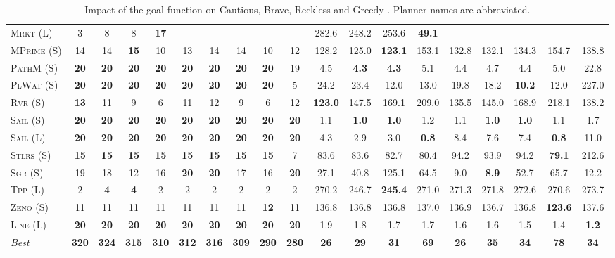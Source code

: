\begin{table}[tb]
{\begin{tabular}{|l||ccccccccc||ccccccccc||}
\textsc{Mrkt} (L)&3&8&8&\textbf{17}&-&-&-&-&-&282.6&248.2&253.6&\textbf{49.1}&-&-&-&-&-\\
\textsc{MPrime} (S)&14&14&\textbf{15}&10&13&14&14&10&12&128.2&125.0&\textbf{123.1}&153.1&132.8&132.1&134.3&154.7&138.8\\
\textsc{PathM} (S)&\textbf{20}&\textbf{20}&\textbf{20}&\textbf{20}&\textbf{20}&\textbf{20}&\textbf{20}&\textbf{20}&19&4.5&\textbf{4.3}&\textbf{4.3}&5.1&4.4&4.7&4.4&5.0&22.8\\
\textsc{PlWat} (S)&\textbf{20}&\textbf{20}&\textbf{20}&\textbf{20}&\textbf{20}&\textbf{20}&\textbf{20}&\textbf{20}&5&24.2&23.4&12.0&13.0&19.8&18.2&\textbf{10.2}&12.0&227.0\\
\textsc{Rvr} (S)&\textbf{13}&11&9&6&11&12&9&6&12&\textbf{123.0}&147.5&169.1&209.0&135.5&145.0&168.9&218.1&138.2\\
\textsc{Sail} (S)&\textbf{20}&\textbf{20}&\textbf{20}&\textbf{20}&\textbf{20}&\textbf{20}&\textbf{20}&\textbf{20}&\textbf{20}&1.1&\textbf{1.0}&\textbf{1.0}&1.2&1.1&\textbf{1.0}&\textbf{1.0}&1.1&1.7\\
\textsc{Sail} (L)&\textbf{20}&\textbf{20}&\textbf{20}&\textbf{20}&\textbf{20}&\textbf{20}&\textbf{20}&\textbf{20}&\textbf{20}&4.3&2.9&3.0&\textbf{0.8}&8.4&7.6&7.4&\textbf{0.8}&11.0\\
\textsc{Stlrs} (S)&\textbf{15}&\textbf{15}&\textbf{15}&\textbf{15}&\textbf{15}&\textbf{15}&\textbf{15}&\textbf{15}&7&83.6&83.6&82.7&80.4&94.2&93.9&94.2&\textbf{79.1}&212.6\\
\textsc{Sgr} (S)&19&18&12&16&\textbf{20}&\textbf{20}&17&16&\textbf{20}&27.1&40.8&125.1&64.5&9.0&\textbf{8.9}&52.7&65.7&12.2\\
\textsc{Tpp} (L)&2&\textbf{4}&\textbf{4}&2&2&2&2&2&2&270.2&246.7&\textbf{245.4}&271.0&271.3&271.8&272.6&270.6&273.7\\
\textsc{Zeno} (S)&11&11&11&11&11&11&11&\textbf{12}&11&136.8&136.8&136.8&137.0&136.9&136.7&136.8&\textbf{123.6}&137.6\\
\textsc{Line} (L)&\textbf{20}&\textbf{20}&\textbf{20}&\textbf{20}&\textbf{20}&\textbf{20}&\textbf{20}&\textbf{20}&\textbf{20}&1.9&1.8&1.7&1.7&1.6&1.6&1.5&1.4&\textbf{1.2}
\\\hline
\textit{Best}&\textbf{320}&\textbf{324}&\textbf{315}&\textbf{310}&\textbf{312}&\textbf{316}&\textbf{309}&\textbf{290}&\textbf{280}&\textbf{26}&\textbf{29}&\textbf{31}&\textbf{69}&\textbf{26}&\textbf{35}&\textbf{34}&\textbf{78}&\textbf{34}\\\hline

        \end{tabular}}
        \caption{Impact of the goal function on Cautious, Brave, Reckless and Greedy \pattyd. Planner names are abbreviated.}
        \label{tab:abl-gf}
        \end{table}
        